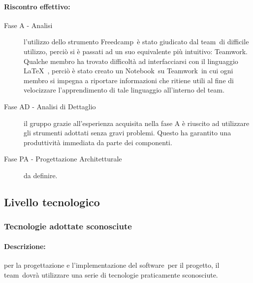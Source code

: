\documentclass[../PianoProgetto.tex]{subfiles}
\begin{document}
	\newpage
	\paragraph*{Riscontro effettivo:} 
		\begin{description}
			\item[Fase A - Analisi] l'utilizzo dello strumento Freedcamp\g\ è stato giudicato dal team\g\ di difficile utilizzo, perciò si è passati ad un suo equivalente più intuitivo: Teamwork\g .
	Qualche membro ha trovato difficoltà ad interfacciarsi con il linguaggio \LaTeX\  , perciò è stato creato un Notebook\g\ su Teamwork\g\ in cui ogni membro si impegna a riportare informazioni che ritiene utili al fine di velocizzare l'apprendimento di tale linguaggio all'interno del team\g .
			\item[Fase AD - Analisi di Dettaglio] il gruppo grazie all'esperienza acquisita nella fase A è riuscito ad utilizzare gli strumenti adottati senza gravi problemi. Questo ha garantito una produttività immediata da parte dei componenti. 
			\item[Fase PA - Progettazione Architetturale] da definire.
		\end{description}
		
\newpage
\subsection{Livello tecnologico}

\subsubsection{Tecnologie adottate sconosciute}
\label{sec:Tecnologie adottate sconosciute}

	\paragraph*{Descrizione:} per la progettazione e l'implementazione del software\g\ per il progetto, il team\g\ dovrà utilizzare una serie di tecnologie praticamente sconosciute.
	
\end{document}

